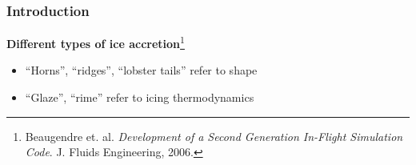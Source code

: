 \documentclass[9pt]{beamer}
\begin{document}
\begin{frame}
\frametitle{Introduction}
\label{sec-1-3}

\textbf{Different types of ice accretion}\footnote{Beaugendre et. al. \emph{Development of a Second Generation In-Flight Simulation Code}. J. Fluids Engineering, 2006.
 }
\begin{itemize}
\item ``Horns'', ``ridges'', ``lobster tails'' refer to shape
\item ``Glaze'', ``rime'' refer to icing thermodynamics
\end{itemize}

\vspace*{-0.0cm}\begin{figure}
 
\end{figure}
\end{frame}
\end{document}
